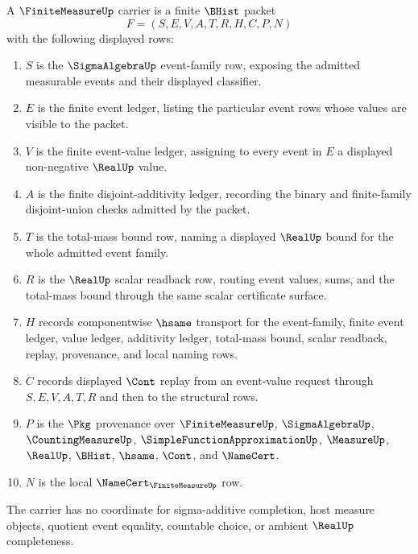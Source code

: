 \begin{definition}
\label{def:finite-measure-carrier}
A $\FiniteMeasureUp$ carrier is a finite $\BHist$ packet
$$
F=(S,E,V,A,T,R,H,C,P,N)
$$
with the following displayed rows:
\begin{enumerate}
\item $S$ is the $\SigmaAlgebraUp$ event-family row, exposing the admitted measurable events and their displayed classifier.
\item $E$ is the finite event ledger, listing the particular event rows whose values are visible to the packet.
\item $V$ is the finite event-value ledger, assigning to every event in $E$ a displayed non-negative $\RealUp$ value.
\item $A$ is the finite disjoint-additivity ledger, recording the binary and finite-family disjoint-union checks admitted by the packet.
\item $T$ is the total-mass bound row, naming a displayed $\RealUp$ bound for the whole admitted event family.
\item $R$ is the $\RealUp$ scalar readback row, routing event values, sums, and the total-mass bound through the same scalar certificate surface.
\item $H$ records componentwise $\hsame$ transport for the event-family, finite event ledger, value ledger, additivity ledger, total-mass bound, scalar readback, replay, provenance, and local naming rows.
\item $C$ records displayed $\Cont$ replay from an event-value request through $S,E,V,A,T,R$ and then to the structural rows.
\item $P$ is the $\Pkg$ provenance over $\FiniteMeasureUp$, $\SigmaAlgebraUp$, $\CountingMeasureUp$, $\SimpleFunctionApproximationUp$, $\MeasureUp$, $\RealUp$, $\BHist$, $\hsame$, $\Cont$, and $\NameCert$.
\item $N$ is the local $\NameCert_{\FiniteMeasureUp}$ row.
\end{enumerate}
The carrier has no coordinate for sigma-additive completion, host measure objects, quotient event equality, countable choice, or ambient $\RealUp$ completeness.
\end{definition}

